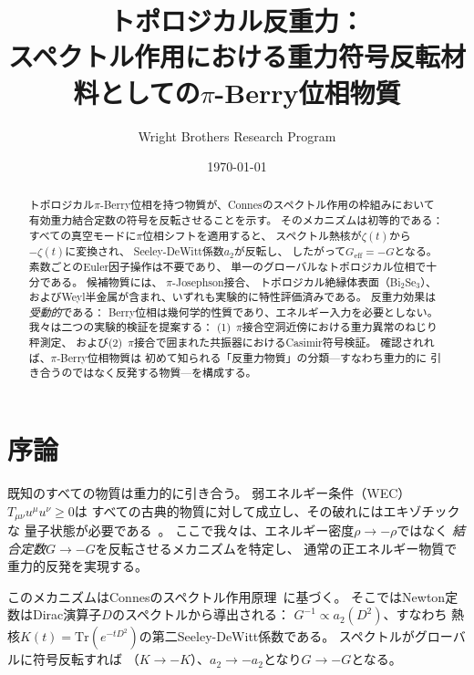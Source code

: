 \documentclass[11pt,a4paper,twocolumn]{article}
\newcommand{\Tr}{\mathrm{Tr}}
\begin{document}
\title{トポロジカル反重力：\\
スペクトル作用における重力符号反転材料としての$\pi$-Berry位相物質}

\author{Wright Brothers Research Program}
\date{\today}

\maketitle

\begin{abstract}
トポロジカル$\pi$-Berry位相を持つ物質が、Connesのスペクトル作用の枠組みにおいて有効重力結合定数の符号を反転させることを示す。
そのメカニズムは初等的である：
すべての真空モードに$\pi$位相シフトを適用すると、
スペクトル熱核が$\zeta(t)$から$-\zeta(t)$に変換され、
Seeley-DeWitt係数$a_2$が反転し、
したがって$G_{\mathrm{eff}} = -G$となる。
素数ごとのEuler因子操作は不要であり、
単一のグローバルなトポロジカル位相で十分である。
候補物質には、
$\pi$-Josephson接合、
トポロジカル絶縁体表面（Bi$_2$Se$_3$）、
およびWeyl半金属が含まれ、いずれも実験的に特性評価済みである。
反重力効果は\emph{受動的}である：
Berry位相は幾何学的性質であり、エネルギー入力を必要としない。
我々は二つの実験的検証を提案する：
(1)~$\pi$接合空洞近傍における重力異常のねじり秤測定、
および(2)~$\pi$接合で囲まれた共振器におけるCasimir符号検証。
確認されれば、$\pi$-Berry位相物質は
初めて知られる「反重力物質」の分類---すなわち重力的に
引き合うのではなく反発する物質---を構成する。
\end{abstract}

\section{序論}

既知のすべての物質は重力的に引き合う。
弱エネルギー条件（WEC）$T_{\mu\nu} u^\mu u^\nu \geq 0$は
すべての古典的物質に対して成立し、その破れにはエキゾチックな
量子状態が必要である~\cite{PfenningFord1997}。
ここで我々は、エネルギー密度$\rho \to -\rho$ではなく
\emph{結合定数}$G \to -G$を反転させるメカニズムを特定し、
通常の正エネルギー物質で重力的反発を実現する。

このメカニズムはConnesのスペクトル作用原理~\cite{Chamseddine1996}に基づく。
そこではNewton定数はDirac演算子$D$のスペクトルから導出される：
$G^{-1} \propto a_2(D^2)$、すなわち
熱核$K(t) = \Tr(e^{-tD^2})$の第二Seeley-DeWitt係数である。
スペクトルがグローバルに符号反転すれば
（$K \to -K$）、$a_2 \to -a_2$となり$G \to -G$となる。
\end{document}
